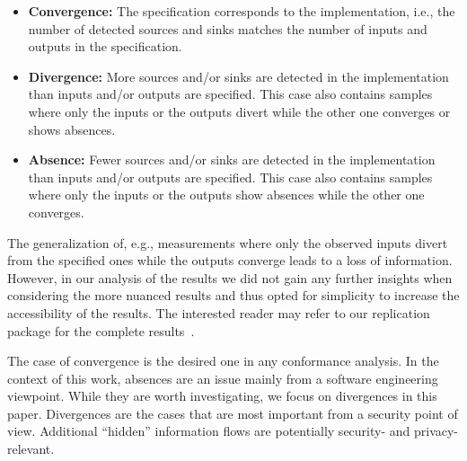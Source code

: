 \begin{itemize}
    \item \textbf{Convergence:} The specification corresponds to the implementation, i.e., the number of detected sources and sinks matches the number of inputs and outputs in the specification.
    \item \textbf{Divergence:} More sources and/or sinks are detected in the implementation than inputs and/or outputs are specified.
    This case also contains samples where only the inputs or the outputs divert while the other one converges or shows absences.
    \item \textbf{Absence:} Fewer sources and/or sinks are detected in the implementation than inputs and/or outputs are specified.
    This case also contains samples where only the inputs or the outputs show absences while the other one converges.
\end{itemize}



The generalization of, e.g., measurements where only the observed inputs divert from the specified ones while the outputs converge leads to a loss of information.
However, in our analysis of the results we did not gain any further insights when considering the more nuanced results and thus opted for simplicity to increase the accessibility of the results.
The interested reader may refer to our replication package for the complete results~\cite{replication_package}.


The case of convergence is the desired one in any conformance analysis.
In the context of this work, absences are an issue mainly from a software engineering viewpoint.
While they are worth investigating, we focus on divergences in this paper.
Divergences are the cases that are most important from a security point of view.
Additional ``hidden'' information flows are potentially security- and privacy-relevant.









